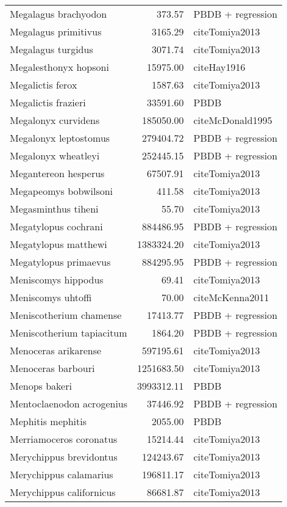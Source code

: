 \begin{table}[ht]
\begin{tabular}{lrl}
  Megalagus brachyodon & 373.57 & PBDB + regression \\ 
  Megalagus primitivus & 3165.29 & cite{Tomiya2013} \\ 
  Megalagus turgidus & 3071.74 & cite{Tomiya2013} \\ 
  Megalesthonyx hopsoni & 15975.00 & cite{Hay1916} \\ 
  Megalictis ferox & 1587.63 & cite{Tomiya2013} \\ 
  Megalictis frazieri & 33591.60 & PBDB \\ 
  Megalonyx curvidens & 185050.00 & cite{McDonald1995} \\ 
  Megalonyx leptostomus & 279404.72 & PBDB + regression \\ 
  Megalonyx wheatleyi & 252445.15 & PBDB + regression \\ 
  Megantereon hesperus & 67507.91 & cite{Tomiya2013} \\ 
  Megapeomys bobwilsoni & 411.58 & cite{Tomiya2013} \\ 
  Megasminthus tiheni & 55.70 & cite{Tomiya2013} \\ 
  Megatylopus cochrani & 884486.95 & PBDB + regression \\ 
  Megatylopus matthewi & 1383324.20 & cite{Tomiya2013} \\ 
  Megatylopus primaevus & 884295.95 & PBDB + regression \\ 
  Meniscomys hippodus & 69.41 & cite{Tomiya2013} \\ 
  Meniscomys uhtoffi & 70.00 & cite{McKenna2011} \\ 
  Meniscotherium chamense & 17413.77 & PBDB + regression \\ 
  Meniscotherium tapiacitum & 1864.20 & PBDB + regression \\ 
  Menoceras arikarense & 597195.61 & cite{Tomiya2013} \\ 
  Menoceras barbouri & 1251683.50 & cite{Tomiya2013} \\ 
  Menops bakeri & 3993312.11 & PBDB \\ 
  Mentoclaenodon acrogenius & 37446.92 & PBDB + regression \\ 
  Mephitis mephitis & 2055.00 & PBDB \\ 
  Merriamoceros coronatus & 15214.44 & cite{Tomiya2013} \\ 
  Merychippus brevidontus & 124243.67 & cite{Tomiya2013} \\ 
  Merychippus calamarius & 196811.17 & cite{Tomiya2013} \\ 
  Merychippus californicus & 86681.87 & cite{Tomiya2013} \\ 

\end{tabular}
\end{table}
